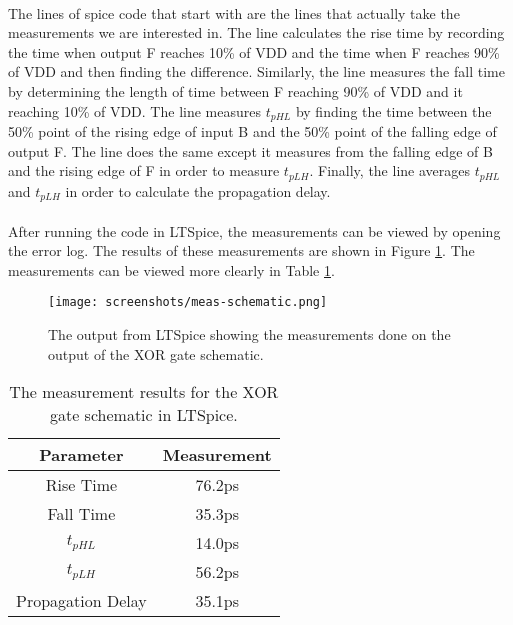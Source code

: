 \documentclass{article}
\begin{document}
  \paragraph{}
  The lines of spice code that start with  are the lines that actually take the measurements we are interested in. The line  calculates the rise time by recording the time when output F reaches 10\% of VDD and the time when F reaches 90\% of VDD and then finding the difference. Similarly, the line  measures the fall time by determining the length of time between F reaching 90\% of VDD and it reaching 10\% of VDD. The line  measures $t_{pHL}$ by finding the time between the 50\% point of the rising edge of input B and the 50\% point of the falling edge of output F. The line  does the same except it measures from the falling edge of B and the rising edge of F in order to measure $t_{pLH}$. Finally, the line  averages $t_{pHL}$ and $t_{pLH}$ in order to calculate the propagation delay.

  \paragraph{}
  After running the code in LTSpice, the measurements can be viewed by opening the error log. The results of these measurements are shown in Figure \ref{fig:meas-sch}. The measurements can be viewed more clearly in Table \ref{table:meas-sch}.

  \begin{figure}[H]
    \centering
    \texttt{[image: screenshots/meas-schematic.png]}
    \caption{The output from LTSpice showing the measurements done on the output of the XOR gate schematic.}
    \label{fig:meas-sch}
  \end{figure}


  \begin{table}[H]
    \centering
    \footnotesize
    \begin{tabular}{|c|c|}
      \hline
      \textbf{Parameter} & \textbf{Measurement} \\
      \hline
      Rise Time & 76.2ps\\
      \hline
      Fall Time & 35.3ps \\
      \hline
      $t_{pHL}$ & 14.0ps \\
      \hline
      $t_{pLH}$ & 56.2ps \\
      \hline
      Propagation Delay & 35.1ps \\
      \hline
    \end{tabular}
    \caption{The measurement results for the XOR gate schematic in LTSpice.}
    \label{table:meas-sch}
  \end{table}
\end{document}

